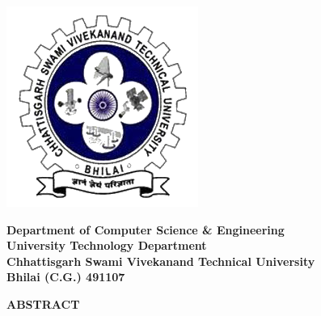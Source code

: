 \newpage
\begin{minipage}{0.17\textwidth}
  \centering
  \includegraphics[width=\textwidth]{images/logo.png}
\end{minipage}
\hfil
\large
\begin{minipage}{0.7\textwidth}
  \centering
  \textbf{Department of Computer Science \& Engineering}\\
  \textbf{University Technology Department}\\
  \textbf{Chhattisgarh Swami Vivekanand Technical University}\\
  \textbf{Bhilai (C.G.) 491107}
\end{minipage}

\noindent\makebox[\linewidth]{\rule{\textwidth}{0.4pt}}

\begin{center}
  \Large\textbf{ABSTRACT}
\end{center}

\vspace{0.5cm}

